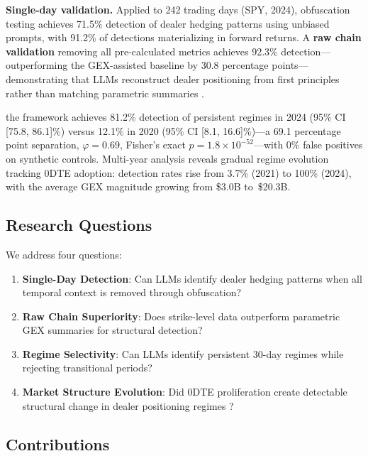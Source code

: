\documentclass[jrfm,article,accept,moreauthors,pdftex]{Definitions/mdpi}
\begin{document}
\textbf{Single-day validation.} Applied to 242 trading days ({SPY, 2024}), %
 obfuscation testing achieves 71.5\% detection of dealer hedging patterns using unbiased prompts, with 91.2\% of detections materializing in forward returns. A \textbf{raw chain validation} removing all pre-calculated metrics achieves 92.3\% detection---outperforming the GEX-assisted baseline by 30.8 percentage points---demonstrating that LLMs reconstruct dealer positioning from first principles rather than matching parametric summaries \citep{regan2025obfuscation}.

 the framework achieves 81.2\% detection of persistent regimes in 2024 (95\% CI [75.8, 86.1]\%) versus 12.1\% in 2020 (95\% CI [8.1, 16.6]\%)---a 69.1 percentage point separation, $\varphi = 0.69$, Fisher's exact $p = 1.8 \times 10^{-52}$---with 0\% false positives on synthetic controls. Multi-year analysis reveals gradual regime evolution tracking 0DTE adoption: detection rates rise from 3.7\% (2021) to 100\% (2024), with the average GEX magnitude growing from \$3.0B to~\$20.3B.

\subsection{Research Questions}

We address four questions:
\begin{enumerate}
\item \textbf{Single-Day Detection}: Can LLMs identify dealer hedging patterns when all temporal context is removed through obfuscation?
\item \textbf{Raw Chain Superiority}: Does strike-level data outperform parametric GEX summaries for structural detection?
\item \textbf{Regime Selectivity}: Can LLMs identify persistent 30-day regimes while rejecting transitional periods?
\item \textbf{Market Structure Evolution}: Did 0DTE proliferation create detectable structural change in dealer positioning regimes \citep{adams2025zerodte}?
\end{enumerate}

\subsection{Contributions}
\end{document}
